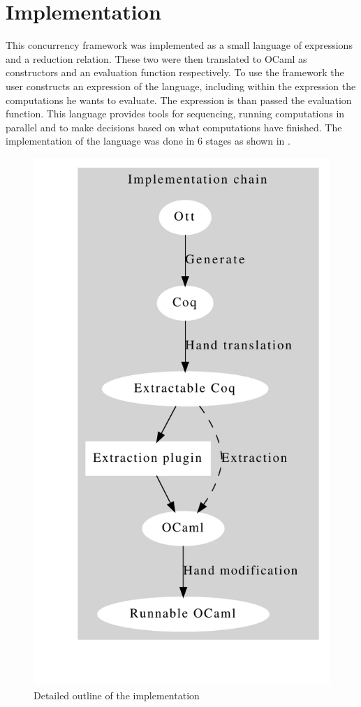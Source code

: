 \documentclass[12pt,twoside,notitlepage]{report}
\begin{document}
\chapter{Implementation}
This concurrency framework was implemented as a small language of expressions and a reduction relation. These two were then translated to OCaml as constructors and an evaluation function respectively. To use the framework the user constructs an expression of the language, including within the expression the computations he wants to evaluate. The expression is than passed the evaluation function.  This language provides tools for sequencing, running computations in parallel and to make decisions based on what computations have finished. The implementation of the language was done in 6 stages as shown in . 
\begin{figure}[h]
\begin{center}
\includegraphics[scale=0.5]{implOut}
\caption{Detailed outline of the implementation}
\label{fig:detailedimploutline}
\end{center}
\end{figure}
\end{document}
